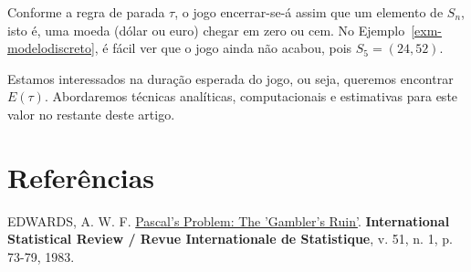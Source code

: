 \documentclass[
  spanish,
  12pt,
]{article}
\newlength{\cslhangindent}
\newenvironment{CSLReferences}[2] %
 {\begin{list}{}{%
  \setlength{\itemindent}{0pt}
  \setlength{\leftmargin}{0pt}
  \setlength{\parsep}{0pt}
  \ifodd #1
   \setlength{\leftmargin}{\cslhangindent}
   \setlength{\itemindent}{-1\cslhangindent}
  \fi
  \setlength{\itemsep}{#2\baselineskip}}}
 {\end{list}}
\theoremstyle{definition}
\theoremstyle{definition}
\theoremstyle{remark}
\begin{document}
Conforme a regra de parada \(\tau\), o jogo encerrar-se-á assim que um
elemento de \(S_n\), isto é, uma moeda (dólar ou euro) chegar em zero ou
cem. No Ejemplo~\ref{exm-modelodiscreto}, é fácil ver que o jogo ainda
não acabou, pois \(S_5 = (24,
52)\).

Estamos interessados na duração esperada do jogo, ou seja, queremos
encontrar \(E(\tau)\). Abordaremos técnicas analíticas, computacionais e
estimativas para este valor no restante deste artigo.

\newpage{}

\section{Referências}\label{referuxeancias}

\label{refs}
\begin{CSLReferences}{0}{1}
EDWARDS, A. W. F. \href{https://doi.org/10.2307/1402732}{Pascal's
Problem: The 'Gambler's Ruin'}. \textbf{International Statistical Review
/ Revue Internationale de Statistique}, v. 51, n. 1, p. 73-79, 1983.

\end{CSLReferences}
\end{document}
